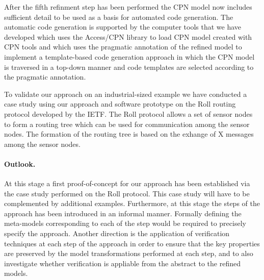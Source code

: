 \documentclass{llncs}
\begin{document}
After the fifth refinment step has been performed the CPN model now
includes sufficient detail to be used as a basis for automated code
generation. The automatic code generation is supported by the computer
tools that we have developed which uses the Access/CPN library to load
CPN model created with CPN tools and which uses the pragmatic
annotation of the refined model to implement a template-based code
generation approach in which the CPN model is traversed in a top-down
manner and code templates are selected according to the pragmatic
annotation.
 
To validate our approach on an industrial-sized example we have
conducted a case study using our approach and software prototype on
the Roll routing protocol developed by the IETF. The Roll protocol
allows a set of sensor nodes to form a routing tree which can be used
for communication among the sensor nodes. The formation of the routing
tree is based on the exhange of X messages among the sensor
nodes. 


\paragraph{\textbf{Outlook}.}

At this stage a first proof-of-concept for our approach has been
established via the case study performed on the Roll protocol. This
case study will have to be complemented by additional
examples. Furthermore, at this stage the steps of the approach has
been introduced in an informal manner. Formally defining the
meta-models corresponding to each of the step would be required to
precisely specify the approach. Another direction is the application
of verification techniques at each step of the approach in order to
ensure that the key properties are preserved by the model
transformations performed at each step, and to also investigate
whether verification is appliable from the abstract to the refined
models.




\end{document}
